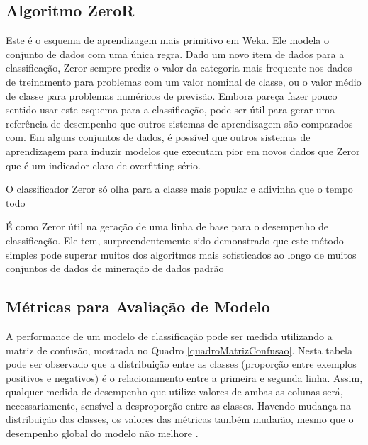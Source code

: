 \documentclass[
	12pt,				%
	openright,			%
	oneside,	
	a4paper,				%
	english,				%
	brazil				%
]{abntex2/abntex2} %
\begin{document}
	\subsection{Algoritmo ZeroR}
	\vspace{1\baselineskip}
	 Este é o esquema de aprendizagem mais primitivo em Weka. Ele modela o conjunto de dados com uma única regra. Dado um novo item de dados para a classificação, Zeror sempre prediz o valor da categoria mais frequente nos dados de treinamento para problemas com um valor nominal de classe, ou o valor médio de classe para problemas numéricos de previsão. Embora pareça fazer pouco sentido usar este esquema para a classificação, pode ser útil para gerar uma referência de desempenho que outros sistemas de aprendizagem são comparados com. Em alguns conjuntos de dados, é possível que outros sistemas de aprendizagem para induzir modelos que executam pior em novos dados que Zeror que é um indicador claro de overfitting sério.
	 
	 O classificador Zeror só olha para a classe mais popular e adivinha que o tempo todo
	 
	 É como Zeror útil na geração de uma linha de base para o desempenho de classificação. Ele tem, surpreendentemente sido demonstrado que este método simples pode superar muitos dos algoritmos mais sofisticados ao longo de muitos conjuntos de dados de mineração de dados padrão \cite{witten:2011}
	 
	\vspace{-1.5\baselineskip}
	\subsection{Métricas para Avaliação de Modelo}
	\vspace{1\baselineskip}
	A performance de um modelo de classificação pode ser medida utilizando a matriz de confusão, mostrada no Quadro \ref{quadroMatrizConfusao}. Nesta tabela pode ser observado que a distribuição entre as classes (proporção entre exemplos positivos e negativos) é o relacionamento entre a primeira e segunda linha. Assim, qualquer medida de desempenho que utilize valores de ambas as colunas será, necessariamente, sensível a desproporção entre as classes. Havendo mudança na distribuição das classes, os valores das métricas também mudarão, mesmo que o desempenho global do modelo não melhore \cite{prati:2008}.
	\\
	
\end{document}

